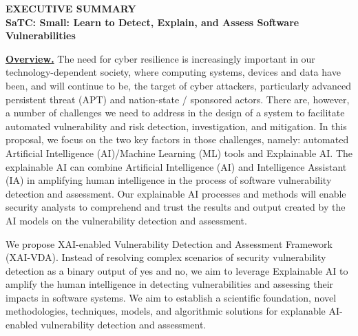 \documentclass[11pt]{article}
\begin{document}


\begin{center}
  {\bf EXECUTIVE SUMMARY\\ SaTC: Small: Learn to Detect, Explain, and Assess Software Vulnerabilities}
\end{center}


\noindent \underline{\bf Overview.}  The need for cyber resilience is
increasingly important in our technology-dependent society, where
computing systems, devices and data have been, and will continue to
be, the target of cyber attackers, particularly advanced persistent
threat (APT) and nation-state / sponsored actors. There are, however,
a number of challenges we need to address in the design of a system to
facilitate automated vulnerability and risk detection, investigation,
and mitigation. In this proposal, we focus on the two key factors in
those challenges, namely: automated Artificial Intelligence
(AI)/Machine Learning (ML) tools and Explainable AI. The explainable AI
can combine Artificial Intelligence (AI) and Intelligence Assistant
(IA) in amplifying human intelligence in the process of software
vulnerability detection and assessment. Our explainable AI processes
and methods will enable security analysts to comprehend and trust the
results and output created by the AI models on the vulnerability
detection and assessment.


We propose XAI-enabled Vulnerability Detection and Assessment
Framework (XAI-VDA). Instead of resolving complex scenarios of
security vulnerability detection as a binary output of yes and no, we
aim to leverage Explainable AI to amplify the human intelligence in
detecting vulnerabilities and assessing their impacts in software
systems. We aim to establish a scientific foundation, novel
methodologies, techniques, models, and algorithmic solutions for
explanable AI-enabled vulnerability detection and assessment.
\end{document}
